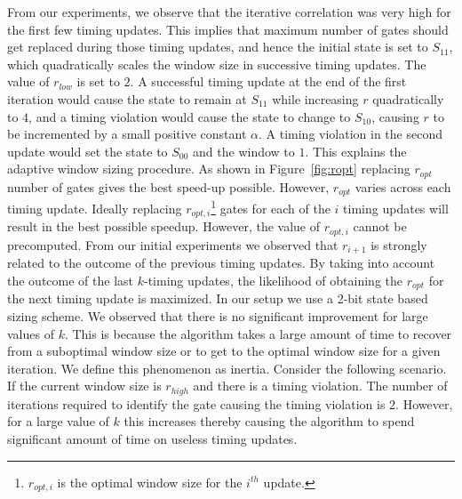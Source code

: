  
From our experiments, we observe that the iterative correlation was very high for the first few timing updates. This implies that maximum number of gates should get replaced during those timing updates, and hence the initial state is set to $S_{11}$, which quadratically scales the window size in successive timing updates. The value of $r_{low}$ is set to $2$. A successful timing update at the end of the first iteration would cause the state to remain at $S_{11}$ while increasing $r$ quadratically to $4$, and a timing violation would cause the state to change to $S_{10}$, causing $r$ to be incremented by a small positive constant $\alpha$. A timing violation in the second update would set the state to $S_{00}$ and the window to $1$. This explains the adaptive window sizing procedure. As shown in Figure~\ref{fig:ropt} replacing $r_{opt}$ number of gates gives the best speed-up possible. However, $r_{opt}$ varies across each timing update. Ideally replacing $r_{opt,i}$\footnote{$r_{opt,i}$ is the optimal window size for the $i^{th}$ update.} gates for each of the $i$ timing updates will result in the best possible speedup. However, the value of $r_{opt,i}$ cannot be precomputed. From our initial experiments we observed that $r_{i+1}$ is strongly related to the outcome of the previous timing updates. By taking into account the outcome of the last $k$-timing updates, the likelihood of obtaining the $r_{opt}$ for the next timing update is maximized. In our setup we use a 2-bit state based sizing scheme. 
\noindent We observed that there is no significant improvement for large values of $k$. This is because the algorithm takes a large amount of time to recover from a suboptimal window size or to get to the optimal window size for a given iteration. We define this phenomenon as inertia. Consider the following scenario. If the current window size is $r_{high}$ and there is a timing violation. The number of iterations required to identify the gate causing the timing violation is $2$. However, for a large value of $k$ this increases thereby causing the algorithm to spend significant amount of time on useless timing updates. 


